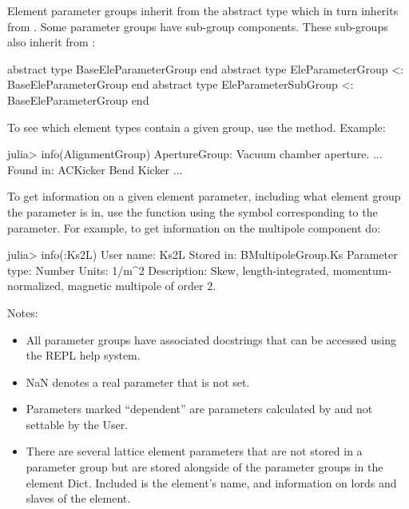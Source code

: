 Element parameter groups inherit from the abstract type  which
in turn inherits from . Some
parameter groups have sub-group components. 
These sub-groups also inherit from :
\begin{example}
  abstract type BaseEleParameterGroup end
  abstract type EleParameterGroup <: BaseEleParameterGroup end
  abstract type EleParameterSubGroup <: BaseEleParameterGroup end
\end{example}

\newpage


To see which element types contain a given group, use the 
method. Example:
\begin{example}
  julia> info(AlignmentGroup)
  ApertureGroup: Vacuum chamber aperture.
  ...
  Found in:
    ACKicker
    Bend
    Kicker
    ...
\end{example}

To get information on a given element parameter, including what element group the parameter is in,
use the  function using the symbol corresponding to the parameter. For example,
to get information on the multipole component  do:
\begin{example}
  julia> info(:Ks2L)
    User name:       Ks2L
    Stored in:       BMultipoleGroup.Ks
    Parameter type:  Number
    Units:           1/m^2
    Description:     Skew, length-integrated, momentum-normalized, 
                                          magnetic multipole of order 2.
\end{example}
  
Notes:
\begin{itemize}
%
\item
All parameter groups have associated docstrings that can be accessed using the REPL help system.
%
\item
NaN denotes a real parameter that is not set.
%
\item
Parameters marked ``dependent'' are parameters calculated by \accellat and not settable by the User.
%
\item
There are several lattice element parameters that are not stored in a parameter group but are stored
alongside of the parameter groups in the element Dict. Included is the element's name, and information
on lords and slaves of the element.
%
\end{itemize}

